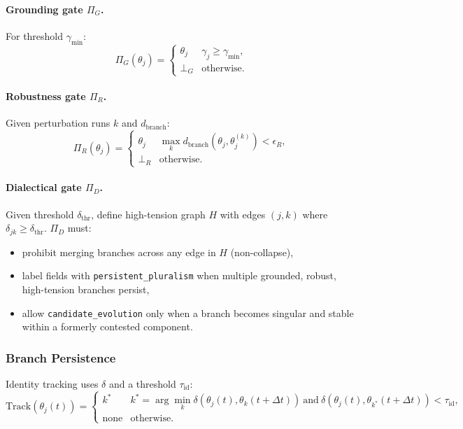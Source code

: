 \documentclass[11pt, a4paper]{article}
\begin{document}
\paragraph{Grounding gate $\Pi_G$.}
For threshold $\gamma_{\min}$:
\[
\Pi_G(\theta_j) =
\begin{cases}
\theta_j & \gamma_j \ge \gamma_{\min},\\[2pt]
\bot_G   & \text{otherwise.}
\end{cases}
\]

\paragraph{Robustness gate $\Pi_R$.}
Given perturbation runs $k$ and $d_{\mathrm{branch}}$:
\[
\Pi_R(\theta_j) =
\begin{cases}
\theta_j & \max_k d_{\mathrm{branch}}(\theta_j, \theta_j^{(k)}) < \epsilon_R,\\[2pt]
\bot_R   & \text{otherwise.}
\end{cases}
\]

\paragraph{Dialectical gate $\Pi_D$.}
Given threshold $\delta_{\mathrm{thr}}$, define high-tension graph $H$ with edges $(j,k)$ where $\delta_{jk} \ge \delta_{\mathrm{thr}}$.
$\Pi_D$ must:
\begin{itemize}[nosep]
  \item prohibit merging branches across any edge in $H$ (non-collapse),
  \item label fields with \texttt{persistent\_pluralism} when multiple grounded, robust, high-tension branches persist,
  \item allow \texttt{candidate\_evolution} only when a branch becomes singular and stable within a formerly contested component.
\end{itemize}

\subsubsection*{Branch Persistence}

Identity tracking uses $\delta$ and a threshold $\tau_{\mathrm{id}}$:
\[
\mathrm{Track}(\theta_j(t)) =
\begin{cases}
k^* & k^* = \arg\min_k \delta(\theta_j(t), \theta_k(t+\Delta t)) \ \text{and}\ \delta(\theta_j(t),\theta_{k^*}(t+\Delta t)) < \tau_{\mathrm{id}},\\[2pt]
\text{none} & \text{otherwise.}
\end{cases}
\]
\end{document}
